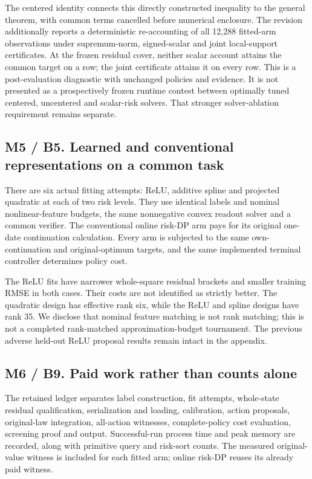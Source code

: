The centered identity connects this directly constructed inequality to
the general theorem, with common terms cancelled before numerical
enclosure. The revision additionally reports a deterministic
re-accounting of all 12,288 fitted-arm observations under supremum-norm,
signed-scalar and joint local-support certificates. At the frozen
residual cover, neither scalar account attains the common target on a
row; the joint certificate attains it on every row. This is a
post-evaluation diagnostic with unchanged policies and evidence. It is
not presented as a prospectively frozen runtime contest between
optimally tuned centered, uncentered and scalar-risk solvers. That
stronger solver-ablation requirement remains separate.

\hypertarget{m5-b5.-learned-and-conventional-representations-on-a-common-task}{%
\subsection{M5 / B5. Learned and conventional representations on a
common
task}\label{m5-b5.-learned-and-conventional-representations-on-a-common-task}}

There are six actual fitting attempts: ReLU, additive spline and
projected quadratic at each of two risk levels. They use identical
labels and nominal nonlinear-feature budgets, the same nonnegative
convex readout solver and a common verifier. The conventional online
risk-DP arm pays for its original one-date continuation calculation.
Every arm is subjected to the same own-continuation and original-optimum
targets, and the same implemented terminal controller determines policy
cost.

The ReLU fits have narrower whole-square residual brackets and smaller
training RMSE in both cases. Their costs are not identified as strictly
better. The quadratic design has effective rank six, while the ReLU and
spline designs have rank 35. We disclose that nominal feature matching
is not rank matching; this is not a completed rank-matched
approximation-budget tournament. The previous adverse held-out ReLU
proposal results remain intact in the appendix.

\hypertarget{m6-b9.-paid-work-rather-than-counts-alone}{%
\subsection{M6 / B9. Paid work rather than counts
alone}\label{m6-b9.-paid-work-rather-than-counts-alone}}

The retained ledger separates label construction, fit attempts,
whole-state residual qualification, serialization and loading,
calibration, action proposals, original-law integration, all-action
witnesses, complete-policy cost evaluation, screening proof and output.
Successful-run process time and peak memory are recorded, along with
primitive query and risk-sort counts. The measured original-value
witness is included for each fitted arm; online risk-DP reuses its
already paid witness.

